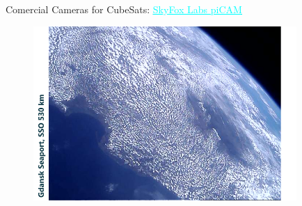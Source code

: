 \begin{frame}{Comercial Cameras for CubeSats: \href{https://www.skyfoxlabs.com/product/27-digital-cubesat-camera}{\textcolor{cyan}{\underline{SkyFox Labs piCAM}}}}

    \begin{figure}[!ht]
        \begin{center}
            \includegraphics[width=10cm]{figures/picam-ex3}
        \end{center}
    \end{figure}

\end{frame}


